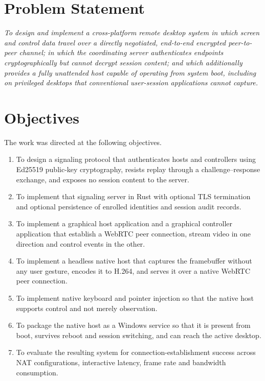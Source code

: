 \section{Problem Statement}

\emph{To design and implement a cross-platform remote desktop system in which
screen and control data travel over a directly negotiated, end-to-end encrypted
peer-to-peer channel; in which the coordinating server authenticates endpoints
cryptographically but cannot decrypt session content; and which additionally
provides a fully unattended host capable of operating from system boot,
including on privileged desktops that conventional user-session applications
cannot capture.}

\section{Objectives}

The work was directed at the following objectives.

\begin{enumerate}
  \item To design a signaling protocol that authenticates hosts and controllers
        using Ed25519 public-key cryptography, resists replay through a
        challenge--response exchange, and exposes no session content to the
        server.
  \item To implement that signaling server in Rust with optional TLS termination
        and optional persistence of enrolled identities and session audit
        records.
  \item To implement a graphical host application and a graphical controller
        application that establish a WebRTC peer connection, stream video in one
        direction and control events in the other.
  \item To implement a headless native host that captures the framebuffer
        without any user gesture, encodes it to H.264, and serves it over a
        native WebRTC peer connection.
  \item To implement native keyboard and pointer injection so that the native
        host supports control and not merely observation.
  \item To package the native host as a Windows service so that it is present
        from boot, survives reboot and session switching, and can reach the
        active desktop.
  \item To evaluate the resulting system for connection-establishment success
        across NAT configurations, interactive latency, frame rate and bandwidth
        consumption.
\end{enumerate}

